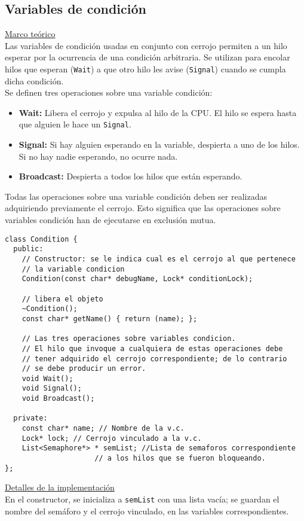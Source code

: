 \subsection*{Variables de condición}
\textsf{\underline{Marco teórico}}\\
 Las variables de condición usadas en conjunto con cerrojo permiten a un hilo esperar por la ocurrencia de una condición arbitraria. Se utilizan para encolar hilos que esperan (\texttt{Wait}) a que otro hilo les avise (\texttt{Signal}) cuando se cumpla dicha condición.\\
Se definen tres operaciones sobre una variable condición:
\begin{itemize}
	\item \textbf{Wait: } Libera el cerrojo y expulsa al hilo de la CPU. El hilo se espera hasta que alguien le hace un \texttt{Signal}.
	\item \textbf{Signal: } Si hay alguien esperando en la variable, despierta a uno de los hilos. Si no hay nadie esperando, no ocurre nada.
	\item \textbf{Broadcast: } Despierta a todos los hilos que están esperando.
\end{itemize}
Todas las operaciones sobre una variable condición deben ser realizadas adquiriendo previamente el cerrojo. Esto significa que las operaciones sobre variables condición han de ejecutarse en exclusión mutua.
\newpage
\begin{lstlisting}[style=C]
class Condition {
  public:
    // Constructor: se le indica cual es el cerrojo al que pertenece
    // la variable condicion
	Condition(const char* debugName, Lock* conditionLock);	

    // libera el objeto
    ~Condition();	
    const char* getName() { return (name); };

    // Las tres operaciones sobre variables condicion.
    // El hilo que invoque a cualquiera de estas operaciones debe
    // tener adquirido el cerrojo correspondiente; de lo contrario
    // se debe producir un error.
    void Wait(); 	
    void Signal();   
    void Broadcast();

  private:
    const char* name; // Nombre de la v.c.
    Lock* lock;	// Cerrojo vinculado a la v.c.
    List<Semaphore*> * semList; //Lista de semaforos correspondiente
                     // a los hilos que se fueron bloqueando.
};
\end{lstlisting}
\textsf{\underline{Detalles de la implementación}}\\
En el constructor, se inicializa a \texttt{semList} con una lista vacía; se guardan el nombre del semáforo y el cerrojo vinculado, en las variables correspondientes.\\

